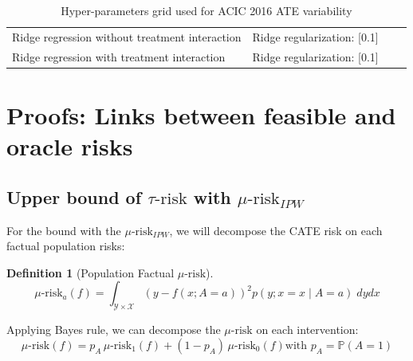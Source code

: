 \documentclass[french,12pt,twoside,a4paper]{book}
\newtheorem{definition}{Definition}
\begin{document}
\begin{appendices}
\begin{table}[h!]
{\begin{tabular}{llll}
        Ridge regression without treatment interaction & Ridge regularization:
        [0.1]                                                                  \\

        Ridge regression with treatment interaction    & Ridge regularization:
        [0.1]                                                                  \\
        \bottomrule
      \end{tabular}
    }
    \caption{Hyper-parameters grid used for ACIC 2016 ATE variability}
    \label{apd:toy_example:acic_2016_ate_variability:table}
  \end{table}



  \section{Proofs: Links between feasible and oracle risks}\label{apd:proofs}

  \subsection{Upper bound of $\tau\text{-risk}$ with
    $\mu\text{-risk}_{IPW}$}%
  \label{apd:proofs:mu_risk_ipw_bound}%

  For the bound with the $\mu\text{-risk}_{IPW}$, we will decompose the CATE risk
  on each factual population risks:

  \begin{definition}[Population Factual $\mu\text{-risk}$]\label{mu_risk_a}
    \citep{shalit_estimating_2017}
    \begin{equation*}
      \mu\text{-risk}_{a}(f)= \int_{\mathcal Y \times \mathcal X} (y-f(x ; A=a))^{2}  p(y ; x=x \mid A=a) \; dy dx
    \end{equation*}
  \end{definition}

  Applying Bayes rule, we can decompose the $\mu\text{-risk}$ on each
  intervention:
  \begin{equation*}
    \mu\text{-risk}(f)
    =p_{A} \,\mu\text{-risk}_{1}(f)+\left(1-p_{A}\right) \,\mu\text{-risk}_{0}(f)
    \text{with } p_A=\mathbb P(A=1)
  \end{equation*}


\end{appendices}
\end{document}
